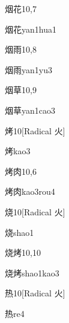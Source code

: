\begin{entry}{烟花}{10,7}
  \begin{phonetics}{烟花}{yan1hua1}
  \end{phonetics}
\end{entry}

\begin{entry}{烟雨}{10,8}
  \begin{phonetics}{烟雨}{yan1yu3}
  \end{phonetics}
\end{entry}

\begin{entry}{烟草}{10,9}
  \begin{phonetics}{烟草}{yan1cao3}
  \end{phonetics}
\end{entry}

\begin{entry}{烤}{10}[Radical 火]
  \begin{phonetics}{烤}{kao3}
  \end{phonetics}
\end{entry}

\begin{entry}{烤肉}{10,6}
  \begin{phonetics}{烤肉}{kao3rou4}
  \end{phonetics}
\end{entry}

\begin{entry}{烧}{10}[Radical 火]
  \begin{phonetics}{烧}{shao1}
  \end{phonetics}
\end{entry}

\begin{entry}{烧烤}{10,10}
  \begin{phonetics}{烧烤}{shao1kao3}
  \end{phonetics}
\end{entry}

\begin{entry}{热}{10}[Radical 火]
  \begin{phonetics}{热}{re4}
  \end{phonetics}
\end{entry}


